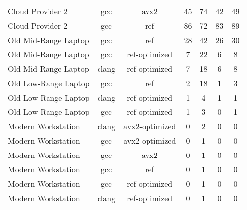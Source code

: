 \begin{table}
\begin{tabularx}{\linewidth}{l c c c c c c}
            Cloud Provider 2 &                  gcc &                 avx2 &                   45 &                   74 &                   42 &                   49\\
            Cloud Provider 2 &                  gcc &                  ref &                   86 &                   72 &                   83 &                   89\\
        Old Mid-Range Laptop &                  gcc &                  ref &                   28 &                   42 &                   26 &                   30\\
        Old Mid-Range Laptop &                  gcc &        ref-optimized &                    7 &                   22 &                    6 &                    8\\
        Old Mid-Range Laptop &                clang &        ref-optimized &                    7 &                   18 &                    6 &                    8\\
        Old Low-Range Laptop &                  gcc &                  ref &                    2 &                   18 &                    1 &                    3\\
        Old Low-Range Laptop &                clang &        ref-optimized &                    1 &                    4 &                    1 &                    1\\
        Old Low-Range Laptop &                  gcc &        ref-optimized &                    1 &                    3 &                    0 &                    1\\
          Modern Workstation &                clang &       avx2-optimized &                    0 &                    2 &                    0 &                    0\\
          Modern Workstation &                  gcc &       avx2-optimized &                    0 &                    1 &                    0 &                    0\\
          Modern Workstation &                  gcc &                 avx2 &                    0 &                    1 &                    0 &                    0\\
          Modern Workstation &                  gcc &                  ref &                    0 &                    1 &                    0 &                    0\\
          Modern Workstation &                  gcc &        ref-optimized &                    0 &                    1 &                    0 &                    0\\
          Modern Workstation &                clang &        ref-optimized &                    0 &                    1 &                    0 &                    0\\
        \bottomrule
    \end{tabularx}
\end{table}
